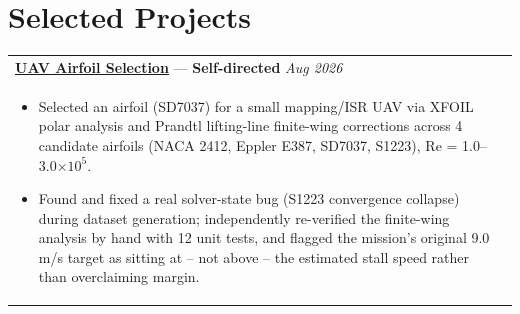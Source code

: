\documentclass[a4paper,8pt]{article}
\newcommand{\ulhref}[2]{%
  {\hypersetup{urlcolor=.}\textcolor{.}{\href{#1}{\uline{#2}}}}%
}
\begin{document}
%

\section{Selected Projects}

\begin{tabularx}{\linewidth}{ @{}l r@{} }
\textbf{\ulhref{https://github.com/Sanjanakamboj/uav-airfoil-selection}{UAV Airfoil Selection}} — \color[HTML]{371e77}\textbf{Self-directed} \hfill \textit{Aug 2026}\\[1pt]
\begin{minipage}[t]{\linewidth}
    \begin{itemize}[nosep,after=\strut, leftmargin=*, itemsep=1pt]
        \item Selected an airfoil (SD7037) for a small mapping/ISR UAV via XFOIL polar analysis and Prandtl lifting-line finite-wing corrections across 4 candidate airfoils (NACA 2412, Eppler E387, SD7037, S1223), Re = 1.0--3.0\(\times10^5\).
        \item Found and fixed a real solver-state bug (S1223 convergence collapse) during dataset generation; independently re-verified the finite-wing analysis by hand with 12 unit tests, and flagged the mission's original 9.0 m/s target as sitting at -- not above -- the estimated stall speed rather than overclaiming margin.
    \end{itemize}
\end{minipage}
\end{tabularx}
\end{document}

